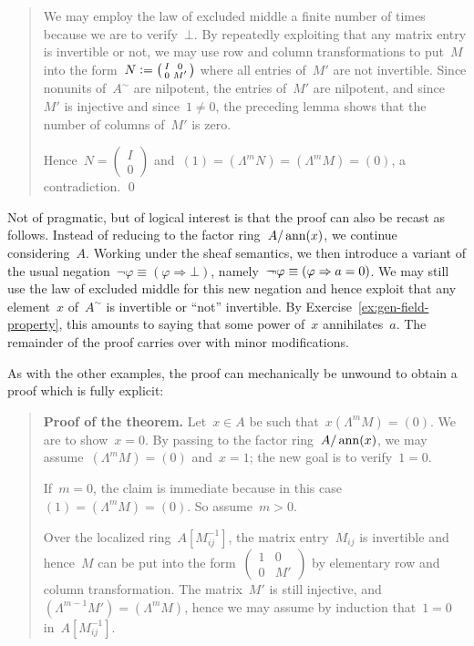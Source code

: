 \documentclass{ws-rv9x6}
\begin{document}
{\begin{quote}
We may employ the law of excluded middle a finite number of times because we
are to verify~$\bot$. By repeatedly exploiting that any matrix entry is
invertible or not, we may use row and column transformations to put~$M$ into
the form~$N \vcentcolon= \left(\begin{smallmatrix}I&0\\0&M'\end{smallmatrix}\right)$ where all
entries of~$M'$ are not invertible. Since nonunits of~$A^\sim$ are nilpotent, the entries of~$M'$ are
nilpotent, and since~$M'$ is injective and since~$1 \neq 0$, the preceding lemma
shows that the number of columns of~$M'$ is zero.

Hence~$N = \left(\begin{smallmatrix}I\\0\end{smallmatrix}\right)$ and~$(1) =
(\Lambda^m N) = (\Lambda^m M) = (0)$, a contradiction. \qed
\end{quote}

\begin{remark}Not of pragmatic, but of logical interest is that the proof can
also be recast as follows. Instead of reducing to the factor ring~$A/\operatorname{ann}(x)$,
we continue considering~$A$. Working under the sheaf semantics, we then
introduce a variant of the usual negation~$\neg\varphi \equiv (\varphi
\Rightarrow \bot)$, namely~$\neg\!\!\!\neg\varphi \equiv (\varphi \Rightarrow a = 0)$.
We may still use the law of excluded middle for this new negation and hence
exploit that any element~$x$ of~$A^\sim$ is invertible or ``not'' invertible. By
Exercise~\ref{ex:gen-field-property}, this amounts to saying that some power
of~$x$ annihilates~$a$. The remainder of the proof carries over with minor
modifications.
\end{remark}

As with the other examples, the proof can mechanically be unwound to obtain a proof
which is fully explicit:

\begin{quote}
\textbf{Proof of the theorem.} Let~$x \in A$ be such that~$x (\Lambda^m M) = (0)$. We are to
show~$x = 0$. By passing to the factor ring~$A/\operatorname{ann}(x)$, we may
assume~$(\Lambda^m M) = (0)$ and~$x = 1$; the new goal is to verify~$1 = 0$.

If~$m = 0$, the claim is immediate because in this case~$(1) = (\Lambda^m M) =
(0)$. So assume~$m > 0$.

Over the localized ring~$A[M_{ij}^{-1}]$, the matrix entry~$M_{ij}$ is
invertible and hence~$M$ can be put into the
form~$\left(\begin{smallmatrix}1&0\\0&M'\end{smallmatrix}\right)$ by elementary
row and column transformation. The matrix~$M'$ is still injective,
and~$(\Lambda^{m-1} M') = (\Lambda^m M)$, hence we may assume by induction
that~$1 = 0$ in~$A[M_{ij}^{-1}]$.


\end{quote}}
\end{document}
